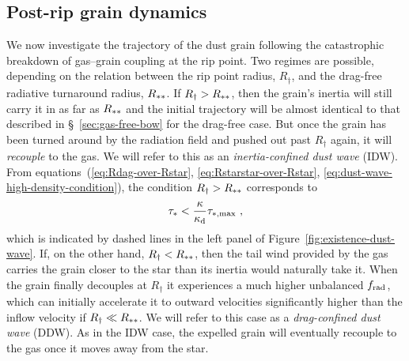 \subsection{Post-rip grain dynamics}
\label{sec:two-regimes-post}

We now investigate the trajectory of the dust grain following the
catastrophic breakdown of gas--grain coupling at the rip point.  Two
regimes are possible, depending on the relation between the rip point
radius, \(R_\dag\), and the drag-free radiative turnaround radius,
\(R_{**}\).  If \(R_\dag > R_{**}\), then the grain's inertia
will still carry it in as far as \(R_{**}\) and the initial
trajectory will be almost identical to that described in
\S~\ref{sec:gas-free-bow} for the drag-free case. But once the grain
has been turned around by the radiation field and pushed out past
\(R_\dag\) again, it will \emph{recouple} to the gas.  
We will refer to this as an \textit{inertia-confined dust wave} (IDW).
From equations~(\ref{eq:Rdag-over-Rstar},
\ref{eq:Rstarstar-over-Rstar},
\ref{eq:dust-wave-high-density-condition}), the condition
\(R_\dag > R_{**}\) corresponds to
\begin{equation}
  \label{eq:IDW}
  \tau_* < \frac{\kappa}{\kappa\grain} \tau_{*,\text{max}} \ , 
\end{equation}
which is indicated by dashed lines in the left panel of
Figure~\ref{fig:existence-dust-wave}.  If, on the other hand,
\(R_\dag < R_{**}\), then the tail wind provided by the gas carries
the grain closer to the star than its inertia would naturally take it.
When the grain finally decouples at \(R_\dag\) it experiences a much
higher unbalanced \(f_{\text{rad}}\), which can initially accelerate it to
outward velocities significantly higher than the inflow velocity if
\(R_\dag \ll R_{**}\).  We will refer to this case as a
\textit{drag-confined dust wave} (DDW).  As in the IDW case, the
expelled grain will eventually recouple to the gas once it moves away
from the star.

\label{sec:grain-traj-along}

